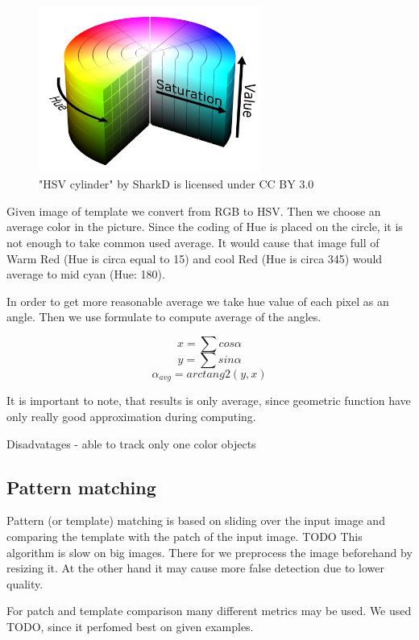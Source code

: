 \begin{figure}\centering
\includegraphics[width=0.65\textwidth]{img/hsv-cylinder.png}
\caption{"HSV cylinder" by SharkD is licensed under CC BY 3.0}
\end{figure}

Given image of template we convert from RGB to HSV. Then we choose an average color in the picture. Since the coding of Hue is placed on the circle, it is not enough to take common used average. It would cause that image full of Warm Red (Hue is circa equal to 15) and cool Red (Hue is circa 345) would average to mid cyan (Hue: 180).

In order to get more reasonable average we take hue value of each pixel as an angle. Then we use formulate to compute average of the angles.

$$ x = \sum cos \alpha $$
$$ y = \sum sin \alpha $$
$$ \alpha_{avg} = arctang2(y, x) $$

It is important to note, that results is only average, since geometric function have only really good approximation during computing.


Disadvatages
- able to track only one color objects

\subsection {Pattern matching}

Pattern (or template) matching is based on sliding over the input image and comparing the template with the patch of the input image. TODO This algorithm is slow on big images. There for we preprocess the image beforehand by resizing it. At the other hand it may cause more false detection due to lower quality.

For patch and template comparison many different metrics may be used. We used TODO, since it perfomed best on given examples.

